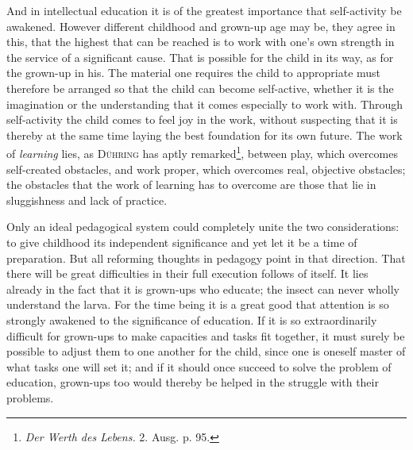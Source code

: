 \documentclass[12pt,a4paper,openany]{book}
\newcommand{\opage}[1]{\marginnote{\footnotesize\textit{[#1]}}}
\begin{document}
And in intellectual education it is of the greatest importance that self-activity be awakened. However different
childhood and grown-up age may be, they agree in this, that the highest that can be reached is to work with one's own
strength in the service of a significant cause. That is possible for the child in its way, as for the grown-up in his.
The material one requires the child to appropriate must therefore be arranged so that the child can become self-active,
whether it is the imagination or the understanding that it comes especially to work with. Through self-activity the
child comes to feel joy in the work, without suspecting that it is thereby at the same time laying the best foundation
for its own future. The work of \textit{learning} lies, as \textsc{Dühring} has aptly remarked\footnote[1]{\textit{Der
Werth des Lebens.} 2. Ausg. p. 95.}, between play, which overcomes self-created obstacles, and work proper, which
overcomes real, objective obstacles; the obstacles that the work of learning has to overcome are those that lie in
sluggishness and lack of practice.

Only an ideal pedagogical system could completely unite the two considerations: to give childhood its independent
significance and yet let it be a time of preparation. But all reforming thoughts in pedagogy point in that direction.
That there will be great difficulties in their full execution follows of itself. It lies already in the fact that it is
grown-ups who educate; the insect can never wholly understand the larva. For the time being it is a great good that
attention is so strongly awakened to the significance of education. If it is so extraordinarily difficult for grown-ups
to make capacities and tasks fit together,
\opage{335}it must surely be possible to adjust them to one another for the child, since one is oneself master of what
tasks one will set it; and if it should once succeed to solve the problem of education, grown-ups too would thereby be
helped in the struggle with their problems.
\end{document}
